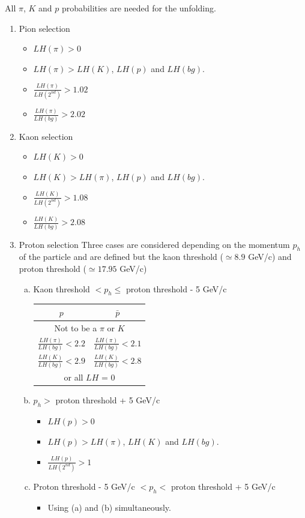 All $\pi$, $K$ and $p$ probabilities are needed for the unfolding.

\begin{enumerate}
  \item Pion selection
  \begin{itemize}
    \item $LH(\pi) > 0$
    \item $LH(\pi) > LH(K)$, $LH(p)$ and $LH(bg)$.
    \item $\frac{LH(\pi)}{LH(2^{nd})}>1.02$
    \item $\frac{LH(\pi)}{LH(bg)}>2.02$
  \end{itemize}
  \item Kaon selection
  \begin{itemize}
    \item $LH(K) > 0$
    \item $LH(K) > LH(\pi)$, $LH(p)$ and $LH(bg)$.
    \item $\frac{LH(K)}{LH(2^{nd})}>1.08$
    \item $\frac{LH(K)}{LH(bg)}>2.08$
  \end{itemize}
  \item Proton selection
  Three cases are considered depending on the momentum $p_{h}$ of the particle and are defined but the kaon threshold ($\simeq 8.9$ GeV/c)
  and proton threshold ($\simeq 17.95$ GeV/c)
  \begin{enumerate}[(a)]
    \item Kaon threshold $< p_{h} \leq$ proton threshold - 5 GeV/c
	  \begin{center}
		  \begin{tabular}{c|c}
		    \hline
		     $p$ & $\bar{p}$ \\
		    \hline
				\multicolumn{2}{c}{Not to be a $\pi$ or $K$} \\
		    $\frac{LH(\pi)}{LH(bg)} < 2.2$ & $\frac{LH(\pi)}{LH(bg)} < 2.1$ \\
		    $\frac{LH(K)}{LH(bg)} < 2.9$ & $\frac{LH(K)}{LH(bg)} < 2.8$ \\
		    \hline
				\multicolumn{2}{c}{or all $LH$ = 0} \\
				\hline
		  \end{tabular}
		\end{center}
    \item $p_{h} >$ proton threshold + 5 GeV/c
    \begin{itemize}
      \item $LH(p) > 0$
      \item $LH(p) > LH(\pi)$, $LH(K)$ and $LH(bg)$.
      \item $\frac{LH(p)}{LH(2^{nd})}>1$
    \end{itemize}
    \item Proton threshold - 5 GeV/c $< p_{h} <$ proton threshold + 5 GeV/c
    \begin{itemize}
      \item Using (a) and (b) simultaneously.
    \end{itemize}
  \end{enumerate}
\end{enumerate}

